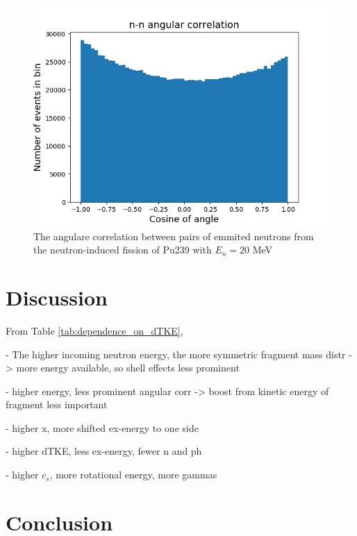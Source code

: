 \documentclass[]{article}
\begin{document}
\begin{figure} [H]
	\centering
	\includegraphics[scale=0.65]{Pu239_20_n_n_ang_corr.png}
	\caption{The angulare correlation between pairs of emmited neutrons from the neutron-induced fission of Pu239 with $E_n= 20$ MeV}
	\label{fig:Pu239_20_n_n_ang_corr}
\end{figure}

\section{Discussion}

From Table \ref{tab:dependence_on_dTKE}, 

- The higher incoming neutron energy, the more symmetric fragment mass distr -> more energy available, so shell effects less prominent

- higher energy, less prominent angular corr -> boost from kinetic energy of fragment less important

- higher x, more shifted ex-energy to one side

- higher dTKE, less ex-energy, fewer n and ph

- higher $c_s$, more rotational energy, more gammas \cite{Wagemans1991}
\section{Conclusion}

\vspace{3mm}



\end{document}
